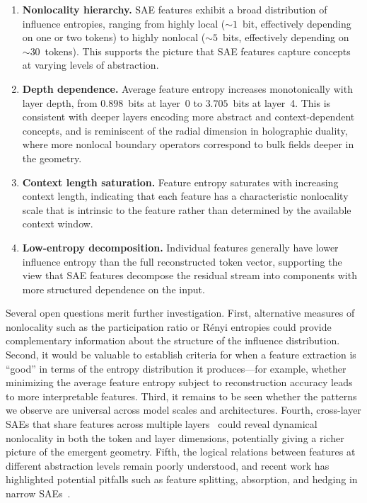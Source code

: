 \documentclass{article}
\begin{document}
\begin{enumerate}
    \item \textbf{Nonlocality hierarchy.} SAE features exhibit a broad
          distribution of influence entropies, ranging from highly local
          (${\sim}1$~bit, effectively depending on one or two tokens) to highly
          nonlocal (${\sim}5$~bits, effectively depending on ${\sim}30$~tokens).
          This supports the picture that SAE features capture concepts at
          varying levels of abstraction.

    \item \textbf{Depth dependence.} Average feature entropy increases
          monotonically with layer depth, from $0.898$~bits at layer~0 to
          $3.705$~bits at layer~4. This is consistent with deeper layers
          encoding more abstract and context-dependent concepts, and is
          reminiscent of the radial dimension in holographic duality, where more
          nonlocal boundary operators correspond to bulk fields deeper in the
          geometry.

    \item \textbf{Context length saturation.} Feature entropy saturates with
          increasing context length, indicating that each feature has a
          characteristic nonlocality scale that is intrinsic to the feature
          rather than determined by the available context window.

    \item \textbf{Low-entropy decomposition.} Individual features generally
          have lower influence entropy than the full reconstructed token vector,
          supporting the view that SAE features decompose the residual stream
          into components with more structured dependence on the input.
\end{enumerate}

Several open questions merit further investigation. First, alternative
measures of nonlocality such as the participation ratio or R\'{e}nyi
entropies could provide complementary information about the structure of
the influence distribution. Second, it would be valuable to establish
criteria for when a feature extraction is ``good'' in terms of the entropy
distribution it produces---for example, whether minimizing the average
feature entropy subject to reconstruction accuracy leads to more
interpretable features. Third, it remains to be seen whether the patterns
we observe are universal across model scales and architectures. Fourth,
cross-layer SAEs that share features across multiple
layers~\citep{shi2025layersharing, bussmann2025matryoshka} could reveal
dynamical nonlocality in both the token and layer dimensions, potentially
giving a richer picture of the emergent geometry. Fifth, the logical
relations between features at different abstraction levels remain poorly
understood, and recent work has highlighted potential pitfalls such as
feature splitting, absorption, and hedging in narrow
SAEs~\citep{chanin2024absorption, chanin2025hedging}.
\end{document}
